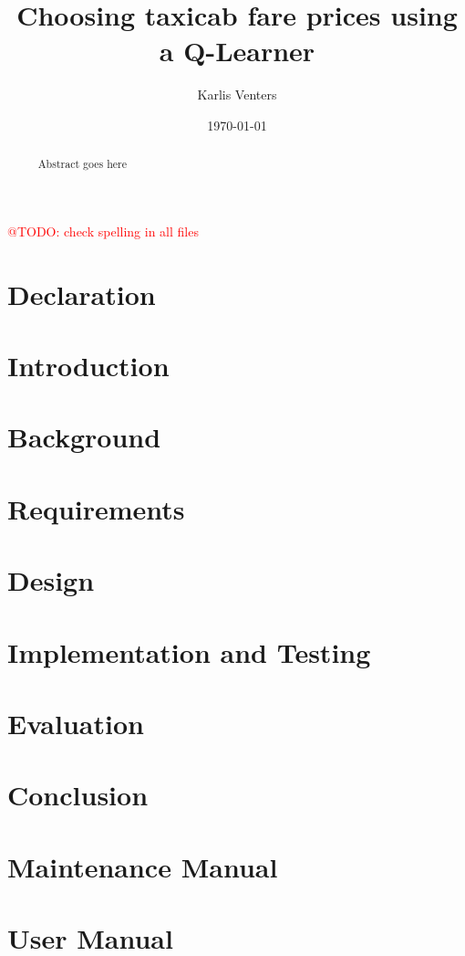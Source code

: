 \documentclass{csfourzero}
\title{Choosing taxicab fare prices using a Q-Learner}
\author{Karlis Venters}
\date{\today}
\makeatletter
\newcommand{\todo}[1]{\textcolor{red}{@TODO: #1}}
\makeatother
\begin{document}
\todo{check spelling in all files}
\maketitle
% 

\begin{abstract}~
Abstract goes here
\end{abstract}

\newpage 
\section*{Declaration}


\newpage
\tableofcontents{}

\newpage
\listoffigures

\newpage
\section{Introduction}
\label{sec:intro}



\newpage
\section{Background}
\label{sec:literature}





\newpage
\section{Requirements}
\label{sec:requirements}


\newpage
\section{Design}
\label{sec:design}



\newpage
\section{Implementation and Testing}
\label{sec:implementation}



\newpage
\section{Evaluation}
\label{sec:evaluation}



\newpage
\section{Conclusion}
\label{sec:conclusion}


\newpage
\printbibliography

\newpage
\appendix
\section{Maintenance Manual}


\newpage
\section{User Manual}

\end{document}
